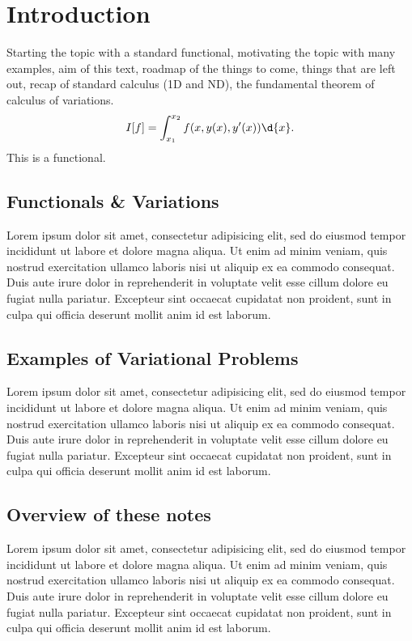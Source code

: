 \section{Introduction}
Starting the topic with a standard functional, motivating the topic with many examples, aim of this text, roadmap of the things to come, things that are left out, recap of standard calculus (1D and ND), the fundamental theorem of calculus of variations.
\begin{equation}
  I[f] = \int_{x_1}^{x_2} f(x,y(x),y'(x)) \d{x}.
\end{equation}
This is a functional.

\subsection{Functionals \& Variations}
Lorem ipsum dolor sit amet, consectetur adipisicing elit, sed do eiusmod tempor incididunt ut labore et dolore magna aliqua. Ut enim ad minim veniam, quis nostrud exercitation ullamco laboris nisi ut aliquip ex ea commodo consequat. Duis aute irure dolor in reprehenderit in voluptate velit esse cillum dolore eu fugiat nulla pariatur. Excepteur sint occaecat cupidatat non proident, sunt in culpa qui officia deserunt mollit anim id est laborum.

\subsection{Examples of Variational Problems}
Lorem ipsum dolor sit amet, consectetur adipisicing elit, sed do eiusmod tempor incididunt ut labore et dolore magna aliqua. Ut enim ad minim veniam, quis nostrud exercitation ullamco laboris nisi ut aliquip ex ea commodo consequat. Duis aute irure dolor in reprehenderit in voluptate velit esse cillum dolore eu fugiat nulla pariatur. Excepteur sint occaecat cupidatat non proident, sunt in culpa qui officia deserunt mollit anim id est laborum.

\subsection{Overview of these notes}
Lorem ipsum dolor sit amet, consectetur adipisicing elit, sed do eiusmod tempor incididunt ut labore et dolore magna aliqua. Ut enim ad minim veniam, quis nostrud exercitation ullamco laboris nisi ut aliquip ex ea commodo consequat. Duis aute irure dolor in reprehenderit in voluptate velit esse cillum dolore eu fugiat nulla pariatur. Excepteur sint occaecat cupidatat non proident, sunt in culpa qui officia deserunt mollit anim id est laborum.

